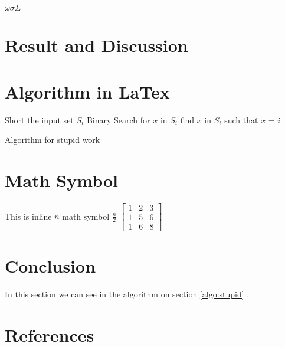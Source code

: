 \documentclass[conference]{IEEEtran}
\begin{document}
\bigskip

$ \omega  \sigma \Sigma $



\section{Result and Discussion}


\section{Algorithm in LaTex}
\begin{algorithm}
	\begin{algorithmic}
		\STATE Short the input set $S_i$
		\STATE Binary Search for $x$ in $S_i$
				\STATE find $x$ in $S_i$ such that $x$ = $i$
					\ENDIF
			\ENDFOR 
	\end{algorithmic}
	\caption{Algorithm for stupid work}
	\label{algo:stupid}
\end{algorithm}

\section{Math Symbol}
This is inline $n$ math symbol $\frac{n}{2}$
$
\left[
	\begin{array}{ccc}
	1&2&3\\
	1&5&6\\
	1&6&8
	\end{array}
\right]
$



\section{Conclusion}
In this section we can see in the algorithm on section \ref{algo:stupid} .


\section{References}


\end{document}
